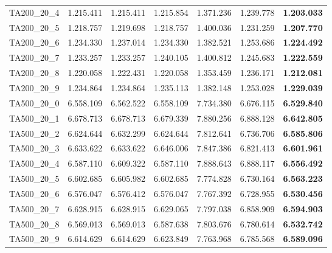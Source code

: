 \begin{tabular}{cc|cc|ccc}
TA200\_20\_4       & 1.215.411        & 1.215.411        & 1.215.854        & 1.371.236        & 1.239.778        & {\bf 1.203.033} \\ 
TA200\_20\_5       & 1.218.757        & 1.219.698        & 1.218.757        & 1.400.036        & 1.231.259        & {\bf 1.207.770} \\ 
TA200\_20\_6       & 1.234.330        & 1.237.014        & 1.234.330        & 1.382.521        & 1.253.686        & {\bf 1.224.492} \\ 
TA200\_20\_7       & 1.233.257        & 1.233.257        & 1.240.105        & 1.400.812        & 1.245.683        & {\bf 1.222.559} \\ 
TA200\_20\_8       & 1.220.058        & 1.222.431        & 1.220.058        & 1.353.459        & 1.236.171        & {\bf 1.212.081} \\ 
TA200\_20\_9       & 1.234.864        & 1.234.864        & 1.235.113        & 1.382.148        & 1.253.028        & {\bf 1.229.039} \\ 
TA500\_20\_0       & 6.558.109        & 6.562.522        & 6.558.109        & 7.734.380        & 6.676.115        & {\bf 6.529.840} \\ 
TA500\_20\_1       & 6.678.713        & 6.678.713        & 6.679.339        & 7.880.256        & 6.888.128        & {\bf 6.642.805} \\ 
TA500\_20\_2       & 6.624.644        & 6.632.299        & 6.624.644        & 7.812.641        & 6.736.706        & {\bf 6.585.806} \\ 
TA500\_20\_3       & 6.633.622        & 6.633.622        & 6.646.006        & 7.847.386        & 6.821.413        & {\bf 6.601.961} \\ 
TA500\_20\_4       & 6.587.110        & 6.609.322        & 6.587.110        & 7.888.643        & 6.888.117        & {\bf 6.556.492} \\ 
TA500\_20\_5       & 6.602.685        & 6.605.982        & 6.602.685        & 7.774.828        & 6.730.164        & {\bf 6.563.223} \\ 
TA500\_20\_6       & 6.576.047        & 6.576.412        & 6.576.047        & 7.767.392        & 6.728.955        & {\bf 6.530.456} \\ 
TA500\_20\_7       & 6.628.915        & 6.628.915        & 6.629.065        & 7.797.038        & 6.858.909        & {\bf 6.594.903} \\ 
TA500\_20\_8       & 6.569.013        & 6.569.013        & 6.587.638        & 7.803.676        & 6.780.614        & {\bf 6.532.742} \\ 
TA500\_20\_9       & 6.614.629        & 6.614.629        & 6.623.849        & 7.763.968        & 6.785.568        & {\bf 6.589.096} \\ 
\end{tabular}